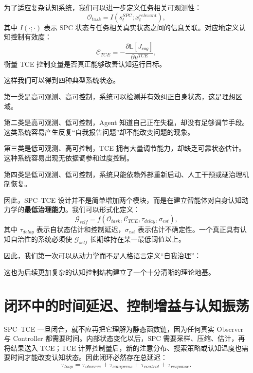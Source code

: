 为了适应复杂认知系统，我们可以进一步定义任务相关可观测性：
\begin{equation}
\mathcal O_{task}
=
I
\left(
s_t^{SPC};
x_t^{relevant}
\right),
\end{equation}
其中 $I(\cdot;\cdot)$ 表示 SPC 状态与任务相关真实状态之间的信息关联。对应地定义认知控制有效度：
\begin{equation}
\mathcal C_{TCE}
=
-
\frac{\partial
\mathbb E[J_{cog}]
}{
\partial u^{TCE}
},
\end{equation}
衡量 TCE 控制变量是否真正能够改善认知运行目标。

这样我们可以得到四种典型系统状态。

第一类是高可观测、高可控制，系统可以检测并有效纠正自身状态，这是理想区域。

第二类是高可观测、低可控制，Agent 知道自己正在失稳，却没有足够调节手段。这类系统容易产生反复``自我报告问题''却不能改变问题的现象。

第三类是低可观测、高可控制，TCE 拥有大量调节能力，却缺乏可靠状态估计。这种系统容易出现无依据调参和过度控制。

第四类是低可观测、低可控制，系统只能依赖外部重新启动、人工干预或硬治理机制恢复。

因此，SPC--TCE 设计并不是简单增加两个模块，而是在建立智能体对自身认知动力学的\textbf{最低治理能力}。我们可以形式化定义：
\begin{equation}
\mathcal G_{self}
=
f
\left(
\mathcal O_{task},
\mathcal C_{TCE},
\tau_{delay},
\sigma_{est}
\right),
\end{equation}
其中 $\tau_{delay}$ 表示自状态估计和控制延迟，$\sigma_{est}$ 表示估计不确定性。一个真正具有认知自治性的系统必须使 $\mathcal G_{self}$ 长期维持在某一最低阈值以上。

因此，我们第一次可以从动力学而不是人格语言定义``自我治理''：
\begin{statementbox}
\centering
{}
\end{statementbox}
这也为后续更加复杂的认知控制结构建立了一个十分清晰的理论地基。

\section{闭环中的时间延迟、控制增益与认知振荡}

SPC--TCE 一旦闭合，就不应再把它理解为静态函数链，因为任何真实 Observer 与 Controller 都需要时间。内部状态变化以后，SPC 需要采样、压缩、估计，再将结果送入 TCE；TCE 计算控制量后，新的注意分布、搜索策略或认知温度也需要时间才能改变认知状态。因此闭环必然存在总延迟：
\begin{equation}
\tau_{loop}
=
\tau_{observe}
+
\tau_{compress}
+
\tau_{control}
+
\tau_{response}.
\end{equation}

